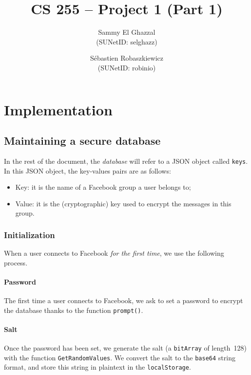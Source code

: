 \documentclass[10pt,twocolumn]{article}
\title{
  CS 255 -- Project 1 (Part 1) }
\author{
  Sammy El Ghazzal\\
  (SUNetID: selghazz)
  \and
  S\'ebastien Robaszkiewicz\\
  (SUNetID: robinio)
}
\date{}
\begin{document}
  \maketitle




\section{Implementation}


\subsection{Maintaining a secure database}

In the rest of the document, the \textit{database} will refer to a JSON object called \texttt{keys}. In this JSON object, the key-values pairs are as follows:
\begin{itemize}
  \item Key: it is the name of a Facebook group a user belongs to;
  \item Value: it is the (cryptographic) key used to encrypt the messages in this group.
\end{itemize}

\subsubsection{Initialization}

When a user connects to Facebook \textit{for the first time}, we use the following process.

\paragraph{Password}
The first time a user connects to Facebook, we ask to set a password to encrypt the database thanks to the function \texttt{prompt()}.

\paragraph{Salt}\label{salt}
Once the password has been set, we generate the salt (a \texttt{bitArray} of length~128) with the function \texttt{GetRandomValues}. We convert the salt to the \texttt{base64} string format, and store this string in plaintext in the \texttt{localStorage}.
\end{document}
